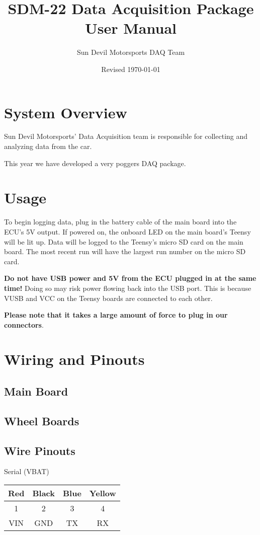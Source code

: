 \documentclass[12pt]{article}
\title{SDM-22 Data Acquisition Package\\User Manual}
\author{Sun Devil Motorsports DAQ Team}
\date{Revised \today}
\begin{document}
\maketitle
\tableofcontents
\section{System Overview}
Sun Devil Motorsports' Data Acquisition team is responsible for collecting and analyzing data from the car.

This year we have developed a very poggers DAQ package.
\pagebreak
\section{Usage}
To begin logging data, plug in the battery cable of the main board into the ECU's 5V output.
If powered on, the onboard LED on the main board's Teensy will be lit up.
Data will be logged to the Teensy's micro SD card on the main board.
The most recent run will have the largest run number on the micro SD card.

\textbf{Do not have USB power and 5V from the ECU plugged in at the same time!}
Doing so may risk power flowing back into the USB port.
This is because VUSB and VCC on the Teensy boards are connected to each other.

\textbf{Please note that it takes a large amount of force to plug in our connectors}.
\section{Wiring and Pinouts}
\subsection{Main Board}
\subsection{Wheel Boards}
\subsection{Wire Pinouts}
Serial (VBAT)

\begin{tabular}{|c|c|c|c|}
\hline
Red & Black & Blue & Yellow \\
\hline
1 & 2 & 3 & 4 \\
\hline
VIN & GND & TX & RX \\
\hline
\end{tabular}
\vspace{1em}
\end{document}

